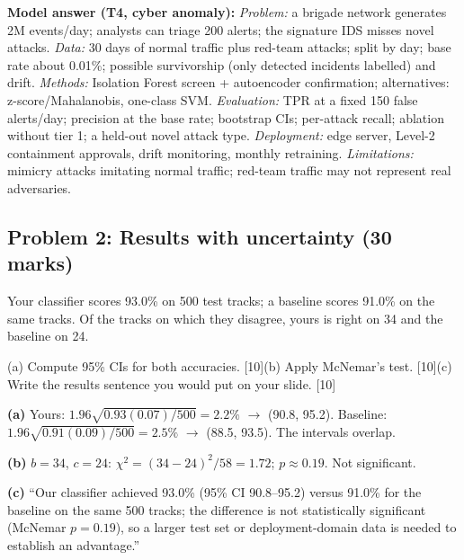 \documentclass[11pt]{article}
\begin{document}
\begin{soln}\textbf{Model answer (T4, cyber anomaly):} \textit{Problem:} a brigade network generates 2M events/day; analysts can triage 200 alerts; the signature IDS misses novel attacks. \textit{Data:} 30 days of normal traffic plus red-team attacks; split by day; base rate about 0.01\%; possible survivorship (only detected incidents labelled) and drift. \textit{Methods:} Isolation Forest screen + autoencoder confirmation; alternatives: z-score/Mahalanobis, one-class SVM. \textit{Evaluation:} TPR at a fixed 150 false alerts/day; precision at the base rate; bootstrap CIs; per-attack recall; ablation without tier 1; a held-out novel attack type. \textit{Deployment:} edge server, Level-2 containment approvals, drift monitoring, monthly retraining. \textit{Limitations:} mimicry attacks imitating normal traffic; red-team traffic may not represent real adversaries.\end{soln}

\subsection{Problem 2: Results with uncertainty \normalfont\small\color{GreyN}(30 marks)}

\begin{prob}Your classifier scores 93.0\% on 500 test tracks; a baseline scores 91.0\% on the same tracks. Of the tracks on which they disagree, yours is right on 34 and the baseline on 24.

(a) Compute 95\% CIs for both accuracies. [10]\newline (b) Apply McNemar's test. [10]\newline (c) Write the results sentence you would put on your slide. [10]\end{prob}

\begin{soln}\textbf{(a)} Yours: $1.96\sqrt{0.93(0.07)/500}=2.2\%$ $\rightarrow$ (90.8, 95.2). Baseline: $1.96\sqrt{0.91(0.09)/500}=2.5\%$ $\rightarrow$ (88.5, 93.5). The intervals overlap.

\textbf{(b)} $b=34$, $c=24$: $\chi^2=(34-24)^2/58=1.72$; $p\approx0.19$. Not significant.

\textbf{(c)} ``Our classifier achieved 93.0\% (95\% CI 90.8--95.2) versus 91.0\% for the baseline on the same 500 tracks; the difference is not statistically significant (McNemar $p=0.19$), so a larger test set or deployment-domain data is needed to establish an advantage.''\end{soln}
\end{document}
